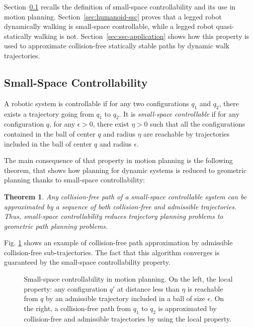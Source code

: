 \documentclass{article}
\newtheorem{theorem}{Theorem}
\begin{document}
Section~\ref{sec:ssc} recalls the definition of small-space controllability and its
use in motion planning. Section~\ref{sec:humanoid-ssc} proves that a legged robot
dynamically walking is small-space controllable, while a legged robot quasi-statically
walking is not. Section~\ref{sec:ssc-application} shows how this property is used to
approximate collision-free statically stable paths by dynamic walk trajectories.


\subsection{Small-Space Controllability}
\label{sec:ssc} 

A  robotic system  is  controllable  if  for any two  configurations
$q_1$ and $q_2$,  there exists  a
trajectory  going  from  $q_1$ to  $q_2$.  It  is  
\textit{small-space  controllable} if for  any configuration  $q$, 
for any $\epsilon >0$, there
exist $\eta >0$ such that all the configurations contained in the ball of center
$q$ and radius $\eta$ are reachable by trajectories included in the
ball of center $q$ and radius $\epsilon$.

The main  consequence of  that property  
in  motion planning  is the following theorem, that shows how planning for
dynamic systems is reduced to geometric planning
thanks to small-space controllability:

\begin{theorem}
  \label{thm:ssc}
  Any collision-free path of a small-space controllable system can be approximated
  by a sequence of both collision-free and admissible trajectories. Thus, small-space 
  controllability reduces trajectory planning problems to geometric path planning problems.
\end{theorem}

Fig. \ref{fig:stc} shows an example of collision-free 
path approximation by admissible collision-free sub-trajectories. The fact 
that this algorithm  converges is guaranteed by the small-space
controllability property.

\begin{figure}[h]
  \centering

  \begin{minipage}{3cm}
    
  \end{minipage}
  \begin{minipage}{4cm}
    
  \end{minipage}
  
  \caption{Small-space controllability in motion planning. On the left,
    the local property: any configuration $q'$ at distance less than
    $\eta$ is reachable from $q$ by an admissible trajectory included in
    a ball of size $\epsilon$. On the right, a collision-free path from
    $q_1$ to $q_2$ is approximated by collision-free and admissible
    trajectories by using the local property.
  }
  \label{fig:stc}
\end{figure}
\end{document}
